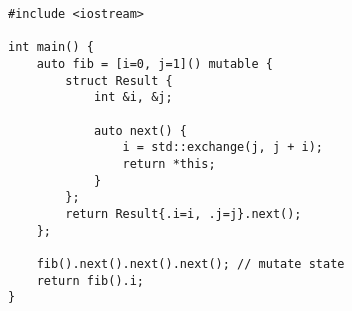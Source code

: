\begin{lstlisting}[title=\href{https://godbolt.org/z/SJqdtk}{\texttt{godbolt.org/z/SJqdtk}}]
#include <iostream>

int main() {
    auto fib = [i=0, j=1]() mutable {
        struct Result {
            int &i, &j;

            auto next() {
                i = std::exchange(j, j + i);
                return *this;
            }
        };
        return Result{.i=i, .j=j}.next();
    };

    fib().next().next().next(); // mutate state
    return fib().i;
}
\end{lstlisting}
